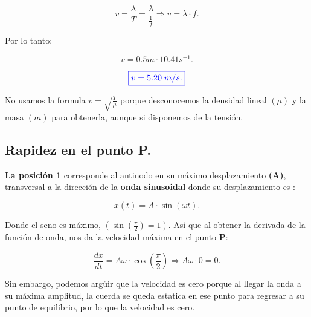 \documentclass[a4paper,12pt]{article} %
\begin{document}
\[v = \frac{\lambda}{T} = \frac{\lambda}{\frac{1}{f}} \Rightarrow v = \lambda \cdot f.\]

\begin{justify}
    Por lo tanto:
\end{justify}

\[v = 0.5m \cdot 10.41 s^{-1}.\]

\vspace{\baselineskip}

\[\textcolor{blue}{\boxed{v = 5.20 \; m/s.}} \]

\vspace{\baselineskip}

\begin{justify}
    No usamos la formula \(v = \sqrt{\frac{T}{\mu}}\) porque desconocemos la densidad lineal \((\mu)\) y la masa \((m)\) para obtenerla, aunque si disponemos de la tensión.
\end{justify}

\vspace{\baselineskip}

\subsection{Rapidez en el punto P.}

\vspace{\baselineskip}

\begin{justify}
    \textbf{La posición 1} corresponde al antinodo en su máximo desplazamiento \textbf{(A)}, transversal a la dirección de la \textbf{onda sinusoidal} donde su desplazamiento es :
\end{justify}

\[x(t) = A \cdot \sin(\omega t).\]

\begin{justify}
    Donde el seno es máximo, \(\left(\sin (\frac{\pi}{2}) = 1\right)\). Así que al obtener la derivada de la función de onda, nos da la velocidad máxima en el punto \textbf{P}:  
\end{justify}

\[\frac{dx}{dt} = A \omega \cdot \cos\left(\frac{\pi}{2}\right) \Rightarrow A \omega  \cdot 0 = 0.\]

\begin{justify}
    Sin embargo, podemos argüir que la velocidad es cero porque al llegar la onda a su máxima amplitud, la cuerda se queda estatica en ese punto para regresar a su punto de equilibrio, por lo que la velocidad es cero.
\end{justify}
\end{document}
